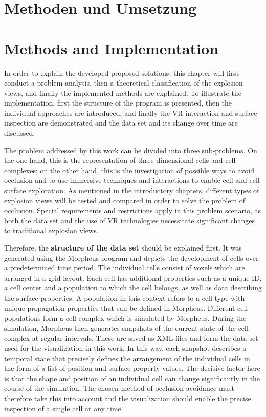 {\chapter{Methoden und Umsetzung}}
{\chapter{Methods and Implementation}}
\label{sec:methods}


In order to explain the developed proposed solutions, this chapter will first conduct a problem analysis, then a theoretical classification of the explosion views, and finally the implemented methods are explained. 
To illustrate the implementation, first the structure of the program is presented, then the individual approaches are introduced, and finally the VR interaction and surface inspection are demonstrated and the data set and its change over time are discussed.

The problem addressed by this work can be divided into three sub-problems. On the one hand, this is the representation of three-dimensional cells and cell complexes; on the other hand, this is the investigation of possible ways to avoid occlusion and to use immersive techniques and interactions to enable cell and cell surface exploration.
As mentioned in the introductory chapters, different types of explosion views will be tested and compared in order to solve the problem of occlusion.
Special requirements and restrictions apply in this problem scenario, as both the data set and the use of VR technologies necessitate significant changes to traditional explosion views.

Therefore, the \textbf{structure of the data set} should be explained first. %
It was generated using the Morpheus program and depicts the development of cells over a predetermined time period.
The individual cells consist of voxels which are arranged in a grid layout. Each cell has additional properties such as a unique ID, a cell center and a population to which the cell belongs, as well as data describing the surface properties. 
A population in this context refers to a cell type with unique propagation properties that can be defined in Morpheus.
Different cell populations form a cell complex which is simulated by Morpheus. 
During the simulation, Morpheus then generates snapshots of the current state of the cell complex at regular intervals. 
These are saved as XML files and form the data set used for the visualization in this work. 
In this way, each snapshot describes a temporal state that precisely defines the arrangement of the individual cells in the form of a list of position and surface property values.
The decisive factor here is that the shape and position of an individual cell can change significantly in the course of the simulation. 
The chosen method of occlusion avoidance must therefore take this into account and the visualization should enable the precise inspection of a single cell at any time.

